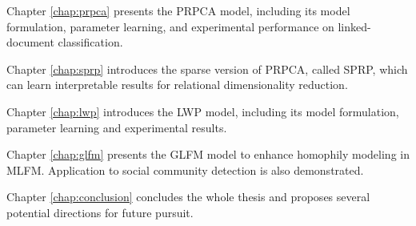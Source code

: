 Chapter \ref{chap:prpca} presents the PRPCA model, including its model formulation, parameter learning, and experimental performance on linked-document classification.

Chapter \ref{chap:sprp} introduces the sparse version of PRPCA, called SPRP, which can learn interpretable results for relational dimensionality reduction.



Chapter \ref{chap:lwp} introduces the LWP model, including its model formulation, parameter learning and experimental results.

Chapter \ref{chap:glfm} presents the GLFM model to enhance homophily modeling in MLFM. Application to social community detection is also demonstrated.

Chapter \ref{chap:conclusion} concludes the whole thesis and proposes several potential directions for future pursuit.


